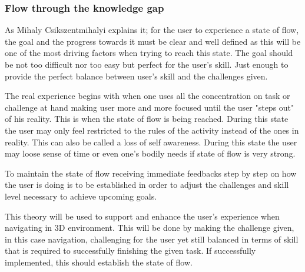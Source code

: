 \subsubsection{Flow through the knowledge gap}
\label{FlowTheory}

As Mihaly Csikszentmihalyi \cite{Flow} explains it; for the user to experience a state of flow, the goal and the progress towards it must be clear and well defined as this will be one of the most driving factors when trying to reach this state. The goal should be not too difficult nor too easy but perfect for the user's skill. Just enough to provide the perfect balance between user's skill and the challenges given.\cite{Flow}
	
The real experience begins with when one uses all the concentration on task or challenge at hand making user more and more focused until the user "steps out" of his reality. This is when the state of flow is being reached. \cite{Flow} During this state the user may only feel restricted to the rules of the activity instead of the ones in reality. This can also be called a loss of self awareness. During this state the user may loose sense of time or even one's bodily needs if state of flow is very strong.\cite{Flow}
	
To maintain the state of flow receiving immediate feedbacks step by step on how the user is doing is to be established in order to adjust the challenges and skill level necessary to achieve upcoming goals. \cite{Flow} 

This theory will be used to support and enhance the user's experience when navigating in 3D environment. This will be done by making the challenge given, in this case navigation, challenging for the user yet still balanced in terms of skill that is required to successfully finishing the given task. If successfully implemented, this should establish the state of flow. \cite{Flow} 
